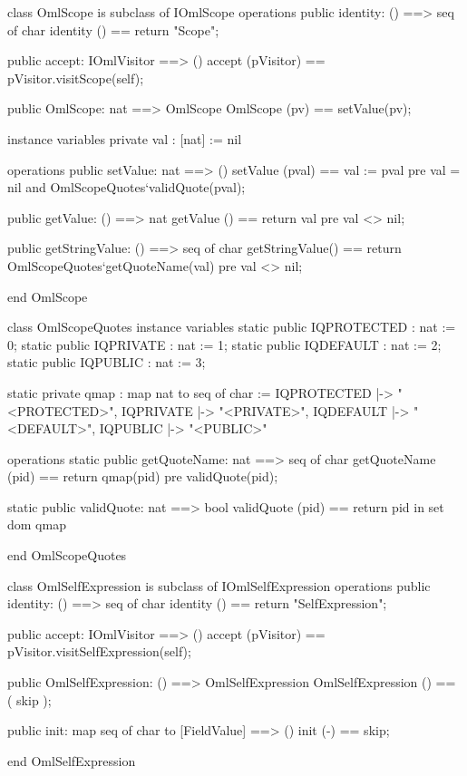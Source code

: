 \begin{vdm_al}
class OmlScope is subclass of IOmlScope
operations
  public identity: () ==> seq of char
  identity () == return "Scope";

  public accept: IOmlVisitor ==> ()
  accept (pVisitor) == pVisitor.visitScope(self);

  public OmlScope: nat ==> OmlScope
  OmlScope (pv) == setValue(pv);

instance variables
  private val : [nat] := nil

operations
  public setValue: nat ==> ()
  setValue (pval) == val := pval
    pre val = nil and OmlScopeQuotes`validQuote(pval);

  public getValue: () ==> nat
  getValue () == return val
    pre val <> nil;

  public getStringValue: () ==> seq of char
  getStringValue() == return OmlScopeQuotes`getQuoteName(val)
    pre val <> nil;

end OmlScope
\end{vdm_al}
\begin{vdm_al}
class OmlScopeQuotes
instance variables
  static public IQPROTECTED : nat := 0;
  static public IQPRIVATE : nat := 1;
  static public IQDEFAULT : nat := 2;
  static public IQPUBLIC : nat := 3;

  static private qmap : map nat to seq of char :=
    { IQPROTECTED |-> "<PROTECTED>",
      IQPRIVATE |-> "<PRIVATE>",
      IQDEFAULT |-> "<DEFAULT>",
      IQPUBLIC |-> "<PUBLIC>" }

operations
  static public getQuoteName: nat ==> seq of char
  getQuoteName (pid) ==
    return qmap(pid)
    pre validQuote(pid);

  static public validQuote: nat ==> bool
  validQuote (pid) == return pid in set dom qmap

end OmlScopeQuotes
\end{vdm_al}
\begin{vdm_al}
class OmlSelfExpression is subclass of IOmlSelfExpression
operations
  public identity: () ==> seq of char
  identity () == return "SelfExpression";

  public accept: IOmlVisitor ==> ()
  accept (pVisitor) == pVisitor.visitSelfExpression(self);

  public OmlSelfExpression:
      () ==> OmlSelfExpression
  OmlSelfExpression () == 
    ( skip );

  public init: map seq of char to [FieldValue] ==> ()
  init (-) == skip;

end OmlSelfExpression
\end{vdm_al}

